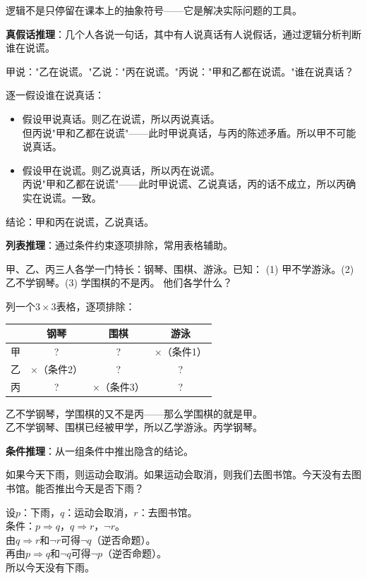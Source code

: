 
逻辑不是只停留在课本上的抽象符号——它是解决实际问题的工具。

\textbf{真假话推理}：几个人各说一句话，其中有人说真话有人说假话，通过逻辑分析判断谁在说谎。

\begin{example}
甲说："乙在说谎。"乙说："丙在说谎。"丙说："甲和乙都在说谎。"谁在说真话？
\end{example}
\begin{solution}
逐一假设谁在说真话：
\begin{itemize}
\item 假设甲说真话。则乙在说谎，所以丙说真话。\\
但丙说"甲和乙都在说谎"——此时甲说真话，与丙的陈述矛盾。所以甲不可能说真话。
\item 假设甲在说谎。则乙说真话，所以丙在说谎。\\
丙说"甲和乙都在说谎"——此时甲说谎、乙说真话，丙的话不成立，所以丙确实在说谎。一致。
\end{itemize}
结论：甲和丙在说谎，乙说真话。
\end{solution}

\textbf{列表推理}：通过条件约束逐项排除，常用表格辅助。

\begin{example}
甲、乙、丙三人各学一门特长：钢琴、围棋、游泳。已知：
(1) 甲不学游泳。\qquad (2) 乙不学钢琴。\qquad (3) 学围棋的不是丙。
他们各学什么？
\end{example}
\begin{solution}
列一个$3\times3$表格，逐项排除：
\begin{center}
\begin{tabular}{c|c|c|c}
 & 钢琴 & 围棋 & 游泳 \\ \hline
甲 & ? & ? & $\times$（条件1）\\
乙 & $\times$（条件2） & ? & ? \\
丙 & ? & $\times$（条件3） & ?
\end{tabular}
\end{center}
乙不学钢琴，学围棋的又不是丙——那么学围棋的就是甲。\\
乙不学钢琴、围棋已经被甲学，所以乙学游泳。丙学钢琴。
\end{solution}

\textbf{条件推理}：从一组条件中推出隐含的结论。

\begin{example}
如果今天下雨，则运动会取消。如果运动会取消，则我们去图书馆。今天没有去图书馆。能否推出今天是否下雨？
\end{example}
\begin{solution}
设$p$：下雨，$q$：运动会取消，$r$：去图书馆。\\
条件：$p\Rightarrow q$，$q\Rightarrow r$，$\lnot r$。\\
由$q\Rightarrow r$和$\lnot r$可得$\lnot q$（逆否命题）。\\
再由$p\Rightarrow q$和$\lnot q$可得$\lnot p$（逆否命题）。\\
所以今天没有下雨。
\end{solution}

